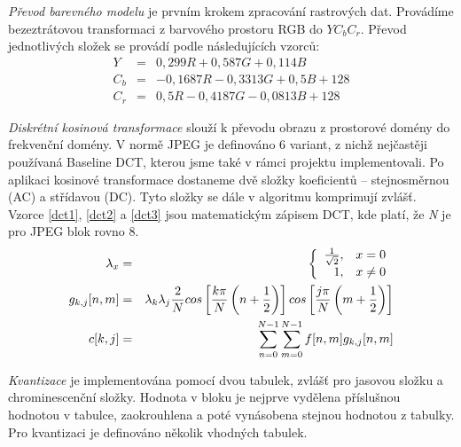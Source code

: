 \documentclass[a4paper,11pt]{article}
\begin{document}
\textit{Převod barevného modelu} je prvním krokem zpracování rastrových dat. Provádíme bezeztrátovou transformaci z barvového prostoru RGB do $YC_bC_r$. Převod jednotlivých složek se provádí podle následujících vzorců:
\begin{eqnarray}
  Y &=& 0,299  R + 0,587  G + 0,114  B\\
  C_b &=& - 0,1687 R - 0,3313 G + 0,5    B + 128\\
  C_r &=&    0,5    R - 0,4187 G - 0,0813 B + 128 
\end{eqnarray}

\textit{Diskrétní kosinová transformace} slouží k převodu obrazu z prostorové domény do frekvenční domény. V normě JPEG
je definováno 6 variant, z nichž nejčastěji používaná Baseline DCT, kterou jsme také v rámci projektu implementovali\cite{mul}. 
Po aplikaci kosinové transformace dostaneme dvě složky koeficientů -- stejnosměrnou (AC) a střídavou (DC). Tyto složky
se dále v algoritmu komprimují zvlášť. Vzorce \ref{dct1}, \ref{dct2} a \ref{dct3} jsou matematickým zápisem DCT,
kde platí, že \textit{N} je pro JPEG blok rovno 8.
\begin{eqnarray}
\lambda_x &=& \left\{ \begin{array}{r@{\quad}c}
    \frac{1}{\sqrt{2}}, & x = 0 \\
    1, & x \neq 0\\ 
\end{array} \right.\label{dct1}\\
g_{k,j}[n,m] &=& \lambda_k \lambda_j \frac{2}{N} cos\left[\frac{k \pi}{N}\left(n+\frac{1}{2}\right)\right] cos\left[\frac{j \pi}{N}\left(m+\frac{1}{2}\right)\right]\label{dct2}\\
c[k,j] &=& \sum^{N-1}_{n=0}{\sum^{N-1}_{m=0}{f[n,m]g_{k,j}[n,m]}}\label{dct3}
\end{eqnarray}


\textit{Kvantizace} je implementována pomocí dvou tabulek, zvlášť pro jasovou složku a chrominescenční složky. Hodnota v 
bloku je nejprve vydělena příslušnou hodnotou v tabulce, zaokrouhlena a poté vynásobena stejnou hodnotou z tabulky.
Pro kvantizaci je definováno několik vhodných tabulek\cite{t81}.
\end{document}
